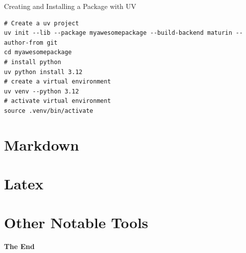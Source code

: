 \documentclass[aspectratio=169,xcolor=dvipsnames,svgnames,x11names,fleqn]{beamer}
\begin{document}
\begin{frame}[containsverbatim]{Creating and Installing a Package with UV}

\begin{verbatim}
# Create a uv project
uv init --lib --package myawesomepackage --build-backend maturin --author-from git
cd myawesomepackage
# install python
uv python install 3.12
# create a virtual environment
uv venv --python 3.12
# activate virtual environment
source .venv/bin/activate
    \end{verbatim}
    
\end{frame}

\section{Markdown}

\begin{frame}
    \sectionpage
\end{frame}

\section{Latex}

\begin{frame}
    \sectionpage
\end{frame}

\section{Other Notable Tools}

\begin{frame}
    \sectionpage
\end{frame}

\begin{frame}
    \Huge{\centerline{\color{bubblegumPink}\textbf{The End}}}
\end{frame}
\end{document}
